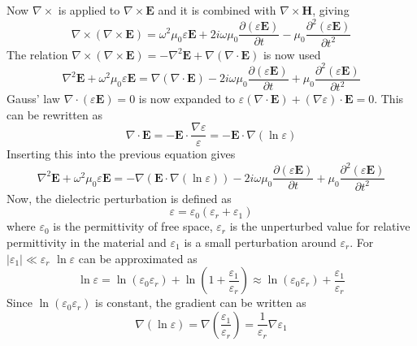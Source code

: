 \documentclass[10pt,a4paper,draft]{scrartcl}
\begin{document}
	Now $\nabla \times$ is applied to $\nabla \times \bm{E}$ and it is combined with $\nabla \times \bm{H}$, giving
	\begin{equation*}
		\nabla \times (\nabla \times \bm{E}) = \omega^2 \mu_0 \varepsilon \bm{E} + 2i\omega \mu_0 \frac{\partial (\varepsilon \bm{E})}{\partial t} - \mu_0 \frac{\partial^2 (\varepsilon \bm{E})}{\partial t^2}
	\end{equation*}
	The relation $\nabla \times (\nabla \times \bm{E}) = -\nabla^2\bm{E} + \nabla(\nabla \cdot \bm{E})$ is now used
	\begin{equation*}
		\nabla^2\bm{E} + \omega^2 \mu_0 \varepsilon \bm{E} = \nabla(\nabla \cdot \bm{E}) - 2i\omega \mu_0 \frac{\partial (\varepsilon \bm{E})}{\partial t} + \mu_0 \frac{\partial^2 (\varepsilon \bm{E})}{\partial t^2}
	\end{equation*}
	Gauss' law $\nabla \cdot (\varepsilon \bm{E}) = 0$ is now expanded to $\varepsilon(\nabla \cdot \bm{E}) + (\nabla \varepsilon) \cdot \bm{E} = 0$. This can be rewritten as
	\begin{equation*}
		\nabla \cdot \bm{E} = -\bm{E} \cdot \frac{\nabla \varepsilon}{\varepsilon} = -\bm{E} \cdot \nabla (\ln{\varepsilon})
	\end{equation*}
	Inserting this into the previous equation gives
	\begin{equation*}
		\nabla^2\bm{E} + \omega^2 \mu_0 \varepsilon \bm{E} = -\nabla(\bm{E} \cdot \nabla (\ln{\varepsilon})) - 2i\omega \mu_0 \frac{\partial (\varepsilon \bm{E})}{\partial t} + \mu_0 \frac{\partial^2 (\varepsilon \bm{E})}{\partial t^2}
	\end{equation*}
	Now, the dielectric perturbation is defined as
	\begin{equation*}
	\varepsilon = \varepsilon_0(\varepsilon_r + \varepsilon_1)
	\end{equation*}
	where $\varepsilon_0$ is the permittivity of free space, $\varepsilon_r$ is the unperturbed value for relative permittivity in the material and $\varepsilon_1$ is a small perturbation around $\varepsilon_r$. For $|\varepsilon_1| \ll \varepsilon_r$ $\ln{\varepsilon}$ can be approximated as
	\begin{equation*}
		\ln{\varepsilon} = \ln(\varepsilon_0 \varepsilon_r) + \ln(1 + \frac{\varepsilon_1}{\varepsilon_r}) \approx \ln(\varepsilon_0 \varepsilon_r) + \frac{\varepsilon_1}{\varepsilon_r}
	\end{equation*}
	Since $\ln(\varepsilon_0 \varepsilon_r)$ is constant, the gradient can be written as
	\begin{equation*}
		\nabla(\ln{\varepsilon}) = \nabla \left( \frac{\varepsilon_1}{\varepsilon_r} \right) = \frac{1}{\varepsilon_r} \nabla \varepsilon_1
	\end{equation*}
\end{document}
